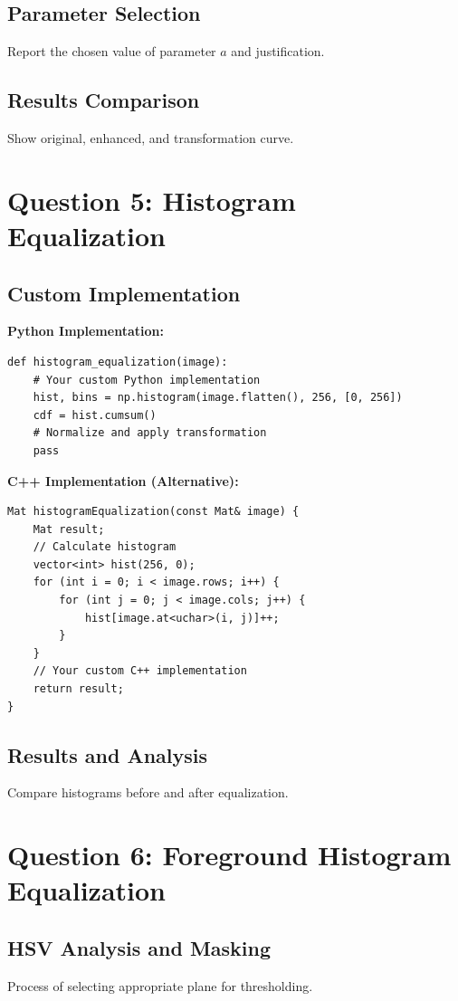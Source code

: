 \documentclass[12pt]{article}
\begin{document}
\subsection{Parameter Selection}
Report the chosen value of parameter $a$ and justification.

\subsection{Results Comparison}
Show original, enhanced, and transformation curve.

\section{Question 5: Histogram Equalization}
\subsection{Custom Implementation}
\textbf{Python Implementation:}
\begin{lstlisting}[style=pythonstyle]
def histogram_equalization(image):
    # Your custom Python implementation
    hist, bins = np.histogram(image.flatten(), 256, [0, 256])
    cdf = hist.cumsum()
    # Normalize and apply transformation
    pass
\end{lstlisting}

\textbf{C++ Implementation (Alternative):}
\begin{lstlisting}[style=cppstyle]
Mat histogramEqualization(const Mat& image) {
    Mat result;
    // Calculate histogram
    vector<int> hist(256, 0);
    for (int i = 0; i < image.rows; i++) {
        for (int j = 0; j < image.cols; j++) {
            hist[image.at<uchar>(i, j)]++;
        }
    }
    // Your custom C++ implementation
    return result;
}
\end{lstlisting}

\subsection{Results and Analysis}
Compare histograms before and after equalization.

\section{Question 6: Foreground Histogram Equalization}
\subsection{HSV Analysis and Masking}
Process of selecting appropriate plane for thresholding.
\end{document}
